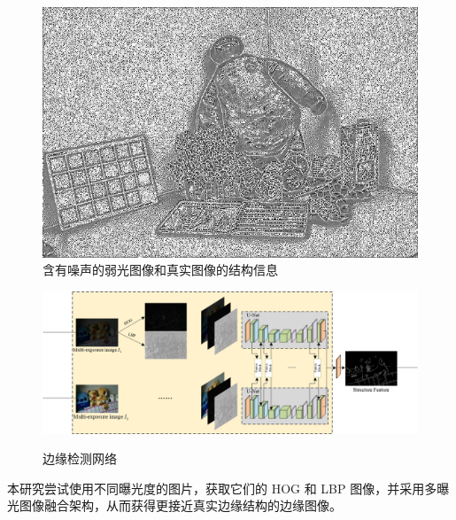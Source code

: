\documentclass[CJK,aspectratio=169]{beamer}  %
\begin{document}
\begin{frame}
\begin{figure}
\begin{minipage}{.3\textwidth}
				\caption*{\small GT HOG}
			\end{minipage}
			\begin{minipage}{.3\textwidth}
				\centering
				\includegraphics[width=\linewidth]{picture/LLIE/My Architecture/Edge Detection/normal00269_lbp}
				\caption*{\small GT LBP}
			\end{minipage}
			\caption{
				\label{fig: LLI Structure Information1}
				含有噪声的弱光图像和真实图像的结构信息
			}
		\end{figure}
	\end{frame}
	
	\begin{frame}
		\begin{figure}
			\centering
			\setlength{\abovecaptionskip}{-0.05cm} 	
			\begin{minipage}{0.9\textwidth}
				\centering
				\includegraphics[width=\linewidth]{picture/LLIE/My Architecture/Edge Detection Network}
				\captionsetup{font=scriptsize}
				\label{fig: Edge Detection Network}	
				\caption{边缘检测网络}
			\end{minipage}
		\end{figure}
		
		\vspace{-0.5cm}
		
		{ \yahei 本研究尝试使用不同曝光度的图片，获取它们的 HOG 和 LBP 图像，并采用多曝光图像融合架构，从而获得更接近真实边缘结构的边缘图像。}
	\end{frame}
	
\end{document}
